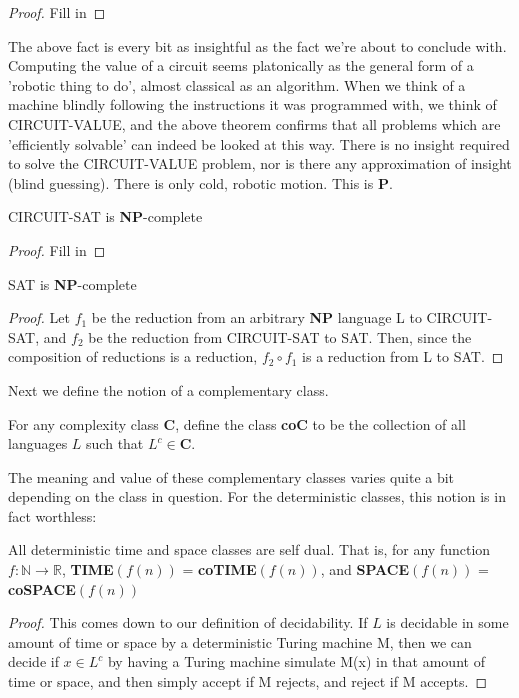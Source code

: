 \begin{proof}
Fill in
\end{proof}
The above fact is every bit as insightful as the fact we're about to conclude with. Computing the value of a circuit seems platonically as the general form of a 'robotic thing to do', almost classical as an algorithm. When we think of a machine blindly following the instructions it was programmed with, we think of CIRCUIT-VALUE, and the above theorem confirms that all problems which are 'efficiently solvable' can indeed be looked at this way. There is no insight required to solve the CIRCUIT-VALUE problem, nor is there any approximation of insight (blind guessing). There is only cold, robotic motion. This is \textbf{P}. 
\begin{theorem}
    CIRCUIT-SAT is \textbf{NP}-complete
\end{theorem}
\begin{proof}
Fill in
\end{proof}
\begin{corollary}
    SAT is \textbf{NP}-complete
\end{corollary}
\begin{proof}
Let $f_1$ be the reduction from an arbitrary \textbf{NP} language L to CIRCUIT-SAT, and $f_2$ be the reduction from CIRCUIT-SAT to SAT. Then, since the composition of reductions is a reduction, $f_2 \circ f_1$ is a reduction from L to SAT. 
\end{proof}
Next we define the notion of a complementary class.
\begin{definition}
    For any complexity class \textbf{C}, define the class \textbf{coC} to be the collection of all languages $L$ such that $L^c \in \textbf{C}$. 
\end{definition}
The meaning and value of these complementary classes varies quite a bit depending on the class in question. For the deterministic classes, this notion is in fact worthless:
\begin{fact}
All deterministic time and space classes are self dual. That is, for any function $f:\mathbb{N} \to \mathbb{R}$, \textbf{TIME$(f(n))$} = \textbf{coTIME$(f(n))$}, and  \textbf{SPACE$(f(n))$} = \textbf{coSPACE$(f(n))$}
\end{fact}
\begin{proof}
    This comes down to our definition of decidability. If $L$ is decidable in some amount of time or space by a deterministic Turing machine M, then we can decide if $x \in L^c$ by having a Turing machine simulate M(x) in that amount of time or space, and then simply accept if M rejects, and reject if M accepts. 
\end{proof}
